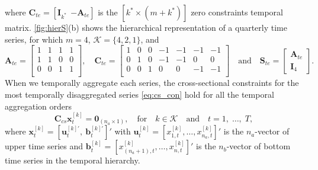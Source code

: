 \documentclass[a4paper,11pt]{article}
\newcommand{\bvet}{\bm{b}}
\newcommand{\uvet}{\bm{u}}
\newcommand{\xvet}{\bm{x}}
\newcommand{\Avet}{\bm{A}}
\newcommand{\Cvet}{\bm{C}}
\newcommand{\Ivet}{\bm{I}}
\newcommand{\Svet}{\bm{S}}
\newcommand{\Zerovet}{\bm{0}}
\theoremstyle{definition}
\begin{document}
where $\Cvet_{te} = [\Ivet_{k^\ast} ~~ {-\Avet_{te}}]$ is the $[k^\ast \times (m+k^\ast)]$ zero constraints temporal matrix.
\autoref{fig:hierS}(b) shows the hierarchical representation of a quarterly time series, for which $m = 4$, $\mathcal{K} = \{4,2,1\}$, and
$$
	\Avet_{te} = \begin{bmatrix}
		1 & 1 & 1 & 1 \\
		1 & 1 & 0 & 0 \\
		0 & 0 & 1 & 1 \\
	\end{bmatrix}, \quad \Cvet_{te} = \begin{bmatrix}
		1 & 0 & 0 & -1 & -1 & -1 & -1 \\
		0 & 1 & 0 & -1 & -1 & 0  & 0  \\
		0 & 0 & 1 & 0  & 0  & -1 & -1 \\
	\end{bmatrix} \quad \mathrm{and} \quad \Svet_{te} = \begin{bmatrix}
		\Avet_{te} \\
		\Ivet_4
	\end{bmatrix}.
$$
When we temporally aggregate each series, the cross-sectional constraints for the most temporally disaggregated series \eqref{eq:cs_con} hold for all the temporal aggregation orders
\begin{equation}
	\label{eq:cs_con2}
	\Cvet_{cs}\xvet^{[k]}_t = \Zerovet_{(n_a \times 1)}, \quad \mathrm{for} \quad k \in \mathcal{K} \quad \mathrm{and} \quad t = 1, \;\dots, \;T,
\end{equation}
where $\xvet_t^{[k]} = \left[\uvet_t^{[k]\prime},~ \bvet_t^{[k]\prime}\right]'$ with $\uvet^{[k]}_t = \left[ x^{[k]}_{1,t}, \dots, x^{[k]}_{n_a,t}\right]'$ is the $n_a$-vector of upper time series and $\bvet^{[k]}_t = \left[x^{[k]}_{(n_a+1),t},\dots,x^{[k]}_{n,t}\right]'$ is the $n_b$-vector of bottom time series in the temporal hierarchy.
\end{document}
